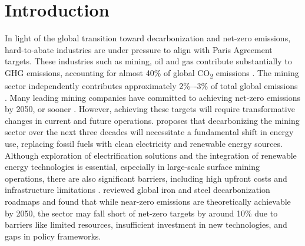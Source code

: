 \documentclass[preprint,12pt]{elsarticle}
\begin{document}
\section{Introduction}
\label{sec:introduction}
In light of the global transition toward decarbonization and net-zero emissions, hard-to-abate industries are under  pressure to align with Paris Agreement targets. These industries such as mining, oil and gas contribute substantially to GHG emissions, accounting for almost 40\% of global CO\textsubscript{2} emissions \citep{gross2021challenge}. The mining sector independently contributes approximately 2\%–-3\% of total global emissions \citep{Bellois2022}. Many leading mining companies have committed to achieving net-zero emissions by 2050, or sooner \citep{Legge2021}. However, achieving these targets will require transformative changes in current and future operations. \citet{Figueiredo2023} proposes that decarbonizing the mining sector over the next three decades will necessitate a fundamental shift in energy use, replacing fossil fuels with clean electricity and renewable energy sources. Although exploration of electrification solutions and the integration of renewable energy technologies is essential, especially in large-scale surface mining operations, there are also significant barriers, including high upfront costs and infrastructure limitations \citep{Issa2023}. \citet{Rumsa2025} reviewed global iron and steel decarbonization roadmaps and found that while near-zero emissions are theoretically achievable by 2050, the sector may fall short of net-zero targets by around 10\% due to barriers like limited resources, insufficient investment in new technologies, and gaps in policy frameworks.
\end{document}
